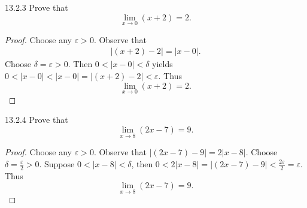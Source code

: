 \documentclass{exam}
\newcommand{\abs}[1]{\lvert#1\rvert}
\begin{document}
\begin{problem}{13.2.3}
    Prove that $$\lim_{x\to0}(x+2)=2.$$
\end{problem}

\begin{proof}
    Choose any $\varepsilon > 0$. Observe that
    \begin{align*}
        \abs{(x+2) - 2} = \abs{x - 0}.
    \end{align*}
    Choose $\delta=\varepsilon>0$. Then $0 < \abs{x - 0} < \delta$ yields $0 < \abs{x - 0} < \abs{x-0} = \abs{(x+2) - 2} < \varepsilon$. Thus $$\lim_{x\to0}(x+2)=2.$$
\end{proof}

\begin{problem}{13.2.4}
    Prove that $$\lim_{x\to8}(2x-7)=9.$$
\end{problem}

\begin{proof}
    Choose any $\varepsilon > 0$. Observe that $\abs{(2x - 7) - 9} = 2\abs{x-8}$. Choose $\delta = \frac{\varepsilon}2 > 0$. Suppose $0 < \abs{x - 8} < \delta$, then $0 < 2\abs{x-8} = \abs{(2x-7)-9} < \frac{2\varepsilon}2 = \varepsilon$. Thus $$\lim_{x\to8}(2x-7)=9.$$
\end{proof}
\end{document}
